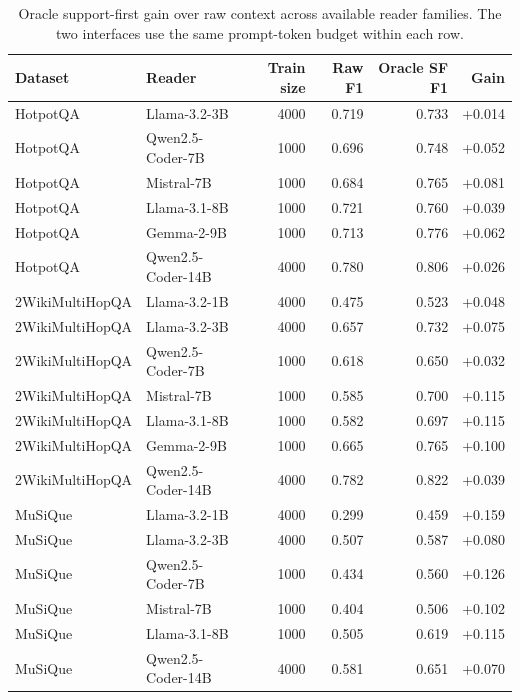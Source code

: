 \documentclass[a4paper,fleqn]{cas-sc}
\begin{document}
\begin{table}[!hbp]
\centering
\caption{Oracle support-first gain over raw context across available reader
families. The two interfaces use the same prompt-token budget within each row.}
\label{tab:appendix-support-first-gain}
\scriptsize
\setlength{\tabcolsep}{3.8pt}
\begin{tabular}{llrrrr}
\toprule
Dataset & Reader & Train size & Raw F1 & Oracle SF F1 & Gain \\
\midrule
HotpotQA & Llama-3.2-3B & 4000 & 0.719 & 0.733 & +0.014 \\
HotpotQA & Qwen2.5-Coder-7B & 1000 & 0.696 & 0.748 & +0.052 \\
HotpotQA & Mistral-7B & 1000 & 0.684 & 0.765 & +0.081 \\
HotpotQA & Llama-3.1-8B & 1000 & 0.721 & 0.760 & +0.039 \\
HotpotQA & Gemma-2-9B & 1000 & 0.713 & 0.776 & +0.062 \\
HotpotQA & Qwen2.5-Coder-14B & 4000 & 0.780 & 0.806 & +0.026 \\
\midrule
2WikiMultiHopQA & Llama-3.2-1B & 4000 & 0.475 & 0.523 & +0.048 \\
2WikiMultiHopQA & Llama-3.2-3B & 4000 & 0.657 & 0.732 & +0.075 \\
2WikiMultiHopQA & Qwen2.5-Coder-7B & 1000 & 0.618 & 0.650 & +0.032 \\
2WikiMultiHopQA & Mistral-7B & 1000 & 0.585 & 0.700 & +0.115 \\
2WikiMultiHopQA & Llama-3.1-8B & 1000 & 0.582 & 0.697 & +0.115 \\
2WikiMultiHopQA & Gemma-2-9B & 1000 & 0.665 & 0.765 & +0.100 \\
2WikiMultiHopQA & Qwen2.5-Coder-14B & 4000 & 0.782 & 0.822 & +0.039 \\
\midrule
MuSiQue & Llama-3.2-1B & 4000 & 0.299 & 0.459 & +0.159 \\
MuSiQue & Llama-3.2-3B & 4000 & 0.507 & 0.587 & +0.080 \\
MuSiQue & Qwen2.5-Coder-7B & 1000 & 0.434 & 0.560 & +0.126 \\
MuSiQue & Mistral-7B & 1000 & 0.404 & 0.506 & +0.102 \\
MuSiQue & Llama-3.1-8B & 1000 & 0.505 & 0.619 & +0.115 \\
MuSiQue & Qwen2.5-Coder-14B & 4000 & 0.581 & 0.651 & +0.070 \\
\bottomrule
\end{tabular}
\end{table}
\end{document}
